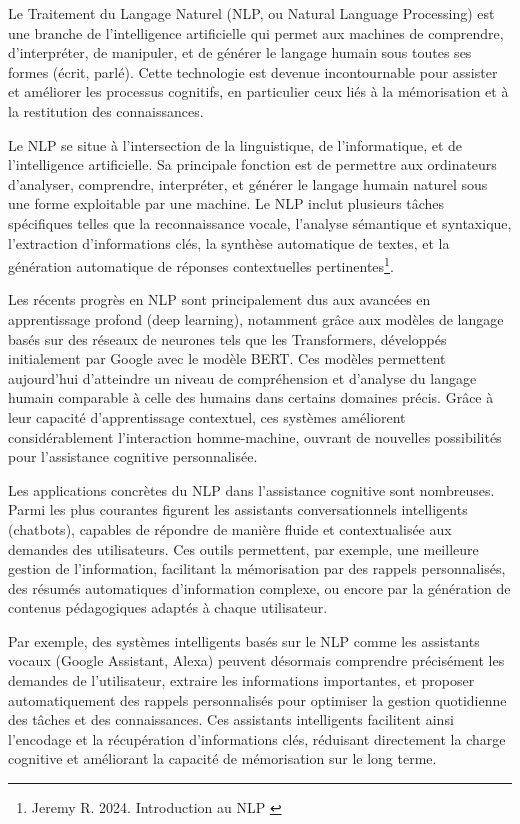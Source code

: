\documentclass[11pt,a4paper]{report}
\begin{document}
Le Traitement du Langage Naturel (NLP, ou Natural Language Processing) est une branche de l’intelligence artificielle qui permet aux machines de comprendre, d’interpréter, de manipuler, et de générer le langage humain sous toutes ses formes (écrit, parlé). Cette technologie est devenue incontournable pour assister et améliorer les processus cognitifs, en particulier ceux liés à la mémorisation et à la restitution des connaissances.

Le NLP se situe à l’intersection de la linguistique, de l’informatique, et de l’intelligence artificielle. Sa principale fonction est de permettre aux ordinateurs d'analyser, comprendre, interpréter, et générer le langage humain naturel sous une forme exploitable par une machine. Le NLP inclut plusieurs tâches spécifiques telles que la reconnaissance vocale, l'analyse sémantique et syntaxique, l'extraction d'informations clés, la synthèse automatique de textes, et la génération automatique de réponses contextuelles pertinentes\footnote{Jeremy R. 2024. Introduction au NLP \cite{nlp}}.

Les récents progrès en NLP sont principalement dus aux avancées en apprentissage profond (deep learning), notamment grâce aux modèles de langage basés sur des réseaux de neurones tels que les Transformers, développés initialement par Google avec le modèle BERT. Ces modèles permettent aujourd’hui d'atteindre un niveau de compréhension et d’analyse du langage humain comparable à celle des humains dans certains domaines précis. Grâce à leur capacité d'apprentissage contextuel, ces systèmes améliorent considérablement l'interaction homme-machine, ouvrant de nouvelles possibilités pour l’assistance cognitive personnalisée.

Les applications concrètes du NLP dans l’assistance cognitive sont nombreuses. Parmi les plus courantes figurent les assistants conversationnels intelligents (chatbots), capables de répondre de manière fluide et contextualisée aux demandes des utilisateurs. Ces outils permettent, par exemple, une meilleure gestion de l’information, facilitant la mémorisation par des rappels personnalisés, des résumés automatiques d’information complexe, ou encore par la génération de contenus pédagogiques adaptés à chaque utilisateur.

Par exemple, des systèmes intelligents basés sur le NLP comme les assistants vocaux (Google Assistant, Alexa) peuvent désormais comprendre précisément les demandes de l’utilisateur, extraire les informations importantes, et proposer automatiquement des rappels personnalisés pour optimiser la gestion quotidienne des tâches et des connaissances. Ces assistants intelligents facilitent ainsi l’encodage et la récupération d'informations clés, réduisant directement la charge cognitive et améliorant la capacité de mémorisation sur le long terme.
\end{document}
